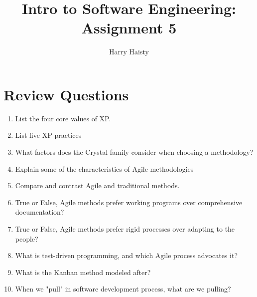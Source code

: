 \documentclass[11pt]{article}
\title{Intro to Software Engineering: Assignment 5}
\author{Harry Haisty}
\begin{document}
\maketitle
\section*{Review Questions}
\begin{enumerate}
    \item List the four core values of XP.
    
    \item List five XP practices
    
    \item What factors does the Crystal family consider when choosing a methodology?
    
    \item Explain some of the characteristics of Agile methodologies
    
    \item Compare and contrast Agile and traditional methods. 
    
    \item True or False, Agile methods prefer working programs over comprehensive documentation?
    
    \item True or False, Agile methods prefer rigid processes over adapting to the people?
    
    \item What is test-driven programming, and which Agile process advocates it?
    
    \item What is the Kanban method modeled after?
    
    \item When we "pull" in software development process, what are we pulling?
\end{enumerate}
    
\end{document}
